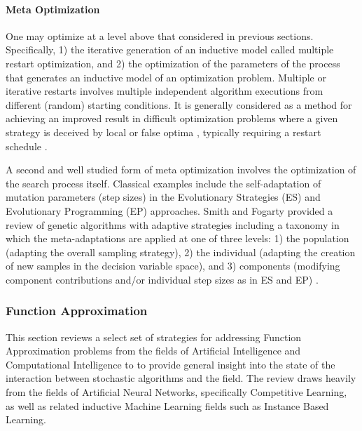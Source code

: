 \paragraph{Meta Optimization}
One may optimize at a level above that considered in previous sections. Specifically, 1) the iterative generation of an inductive model called multiple restart optimization, and 2) the optimization of the parameters of the process that generates an inductive model of an optimization problem. Multiple or iterative restarts involves multiple independent algorithm executions from different (random) starting conditions. It is generally considered as a method for achieving an improved result in difficult optimization problems where a given strategy is deceived by local or false optima \cite{Muselli1997, Hu1994}, typically requiring a restart schedule \cite{Fukunaga1998}. 

A second and well studied form of meta optimization involves the optimization of the search process itself. Classical examples include the self-adaptation of mutation parameters (step sizes) in the Evolutionary Strategies (ES) and Evolutionary Programming (EP) approaches. Smith and Fogarty provided a review of genetic algorithms with adaptive strategies including a taxonomy in which the meta-adaptations are applied at one of three levels: 1) the population (adapting the overall sampling strategy), 2) the individual (adapting the creation of new samples in the decision variable space), and 3) components (modifying component contributions and/or individual step sizes as in ES and EP) \cite{Smith1997b}.



%
%
\subsubsection{Function Approximation}
This section reviews a select set of strategies for addressing Function Approximation problems from the fields of Artificial Intelligence and Computational Intelligence to to provide general insight into the state of the interaction between stochastic algorithms and the field. The review draws heavily from the fields of Artificial Neural Networks, specifically Competitive Learning, as well as related inductive Machine Learning fields such as Instance Based Learning.

